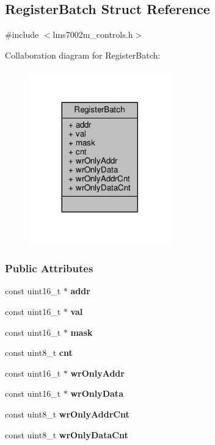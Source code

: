 \subsection{Register\+Batch Struct Reference}
\label{structRegisterBatch}


{\ttfamily \#include $<$lms7002m\+\_\+controls.\+h$>$}



Collaboration diagram for Register\+Batch\+:
\nopagebreak
\begin{figure}[H]
\begin{center}
\leavevmode
\includegraphics[width=173pt]{d0/d28/structRegisterBatch__coll__graph}
\end{center}
\end{figure}
\subsubsection*{Public Attributes}
\begin{DoxyCompactItemize}
\item 
const uint16\+\_\+t $\ast$ {\bf addr}
\item 
const uint16\+\_\+t $\ast$ {\bf val}
\item 
const uint16\+\_\+t $\ast$ {\bf mask}
\item 
const uint8\+\_\+t {\bf cnt}
\item 
const uint16\+\_\+t $\ast$ {\bf wr\+Only\+Addr}
\item 
const uint16\+\_\+t $\ast$ {\bf wr\+Only\+Data}
\item 
const uint8\+\_\+t {\bf wr\+Only\+Addr\+Cnt}
\item 
const uint8\+\_\+t {\bf wr\+Only\+Data\+Cnt}
\end{DoxyCompactItemize}


